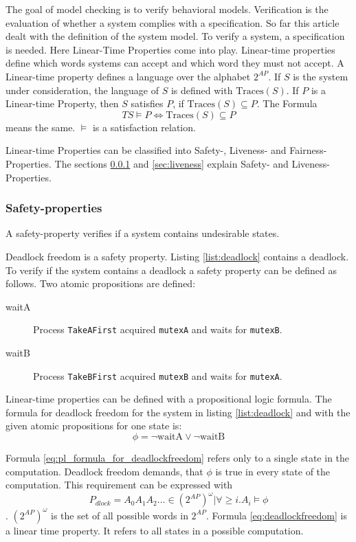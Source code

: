 \documentclass[12pt,a4paper,twoside]{article}
\begin{document}
The goal of model checking is to verify behavioral models. Verification is the evaluation of whether a system complies with a specification. So far this article dealt with the definition of the system model. To verify a system, a specification is needed. Here Linear-Time Properties come into play. Linear-time properties define which words systems can accept and which word they must not accept. A Linear-time property defines a language over the alphabet $2^{AP}$. If $S$ is the system under consideration, the language of $S$ is defined with $\text{Traces}(S)$. If $P$ is a Linear-time Property, then $S$ satisfies $P$, if $\text{Traces}(S) \subseteq P$. The Formula 
\[
TS \models P \iff \text{Traces}(S) \subseteq P 
\]
means the same. $ \models $ is a satisfaction relation\cite[p. 98]{baier08}.

Linear-time Properties can be classified into Safety-, Liveness- and Fair\-ness-Properties. The sections \ref{sec:safety} and \ref{sec:liveness} explain Safety- and Liveness-Properties.

\subsubsection{Safety-properties}
\label{sec:safety}

A safety-property verifies if a system contains undesirable states.

Deadlock freedom is a safety property. Listing \ref{list:deadlock} contains a deadlock. To verify if the system contains a deadlock a safety property can be defined as follows. Two atomic propositions are defined:
\begin{description}
\item[waitA] Process \texttt{TakeAFirst} acquired \texttt{mutexA} and waits for \texttt{mutexB}.
\item[waitB] Process \texttt{TakeBFirst} acquired \texttt{mutexB} and waits for \texttt{mutexA}.
\end{description}

Linear-time properties can be defined with a propositional logic formula. The formula for deadlock freedom for the system in listing \ref{list:deadlock} and with the given atomic propositions for one state is:
\begin{equation}
  \label{eq:pl_formula_for_deadlockfreedom}
\phi = \neg \text{waitA} \lor \neg \text{waitB}  
\end{equation}

Formula \ref{eq:pl_formula_for_deadlockfreedom} refers only to a single state in the computation. Deadlock freedom demands, that $\phi$ is true in every state of the computation. This requirement can be expressed with
\begin{equation}
  \label{eq:deadlockfreedom}
  P_{dlock} = {A_0 A_1 A_2 \dots \in (2^{AP})^{\omega} | \forall \geq i.   A_i \models \phi}
\end{equation}
. $(2^{AP})^{\omega}$ is the set of all possible words in $2^{AP}$.
Formula \ref{eq:deadlockfreedom} is a linear time property. It refers to all states in a possible computation. 
\end{document}
